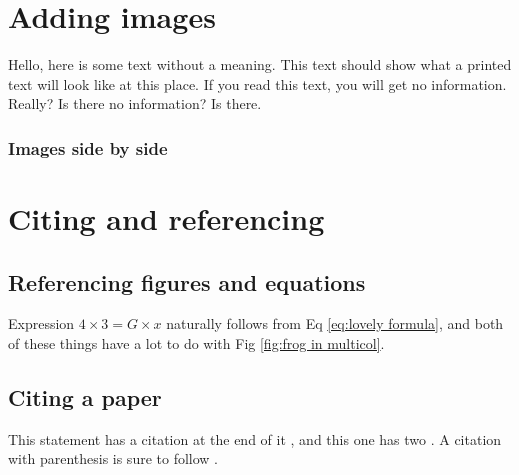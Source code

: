 \documentclass{article}
\begin{document}
\section{Adding images}
Hello, here is some text without a meaning.  This text should show what a printed text will look like at this place. If you read this text, you will get no information.  Really?  Is there no information?  Is there.


\lipsum[7]

\subsubsection{Images side by side}

\section{Citing and referencing}

\subsection{Referencing figures and equations}
 Expression $4\times 3=G\times x$ naturally follows from Eq \ref{eq:lovely formula}, and both of these things have a lot to do with Fig \ref{fig:frog in multicol}.
 
 \subsection{Citing a paper}
This statement has a citation at the end of it \cite{toadetal1958}, and this one has two \cite{toadetal1958, squeaker1982}. A citation with parenthesis is sure to follow \citep{siddiqi2004interspecific}.

 




\end{document}

